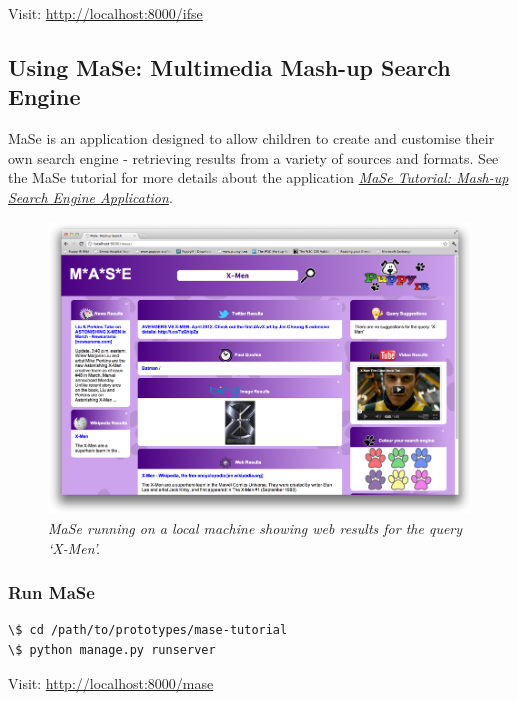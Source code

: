\documentclass[letterpaper,10pt,english]{sphinxmanual}
\begin{document}
Visit: \href{http://localhost:8000/ifse}{http://localhost:8000/ifse}


\subsection{Using MaSe: Multimedia Mash-up Search Engine}
\label{prototypes:using-mase-multimedia-mash-up-search-engine}
MaSe is an application designed to allow children to create and customise their own search engine - retrieving results from a variety of sources and formats. See the MaSe tutorial for more details about the application {\hyperref[mase-tutorial:mase-mash-up-search-engine-puppyir-tutorial]{\emph{MaSe Tutorial: Mash-up Search Engine Application}}}.
\begin{figure}[htbp]
\centering
\capstart

\includegraphics{mase-7-all.png}
\caption{\emph{MaSe running on a local machine showing web results for the query `X-Men'.}}\end{figure}


\subsubsection{Run MaSe}
\label{prototypes:run-mase}
\begin{Verbatim}[commandchars=\\\{\}]
\$ cd /path/to/prototypes/mase-tutorial
\$ python manage.py runserver
\end{Verbatim}

Visit: \href{http://localhost:8000/mase}{http://localhost:8000/mase}
\end{document}
